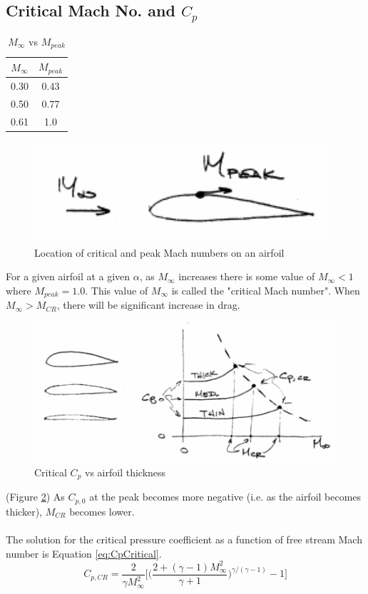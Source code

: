 \documentclass[draft=false, titlepage]{article}
\begin{document}
\subsection{Critical Mach No. and $C_p$}
\begin{table}
	\caption{$M_\infty$ vs $M_{peak}$}
	\centering
	\begin{tabular}{cc}
		$M_\infty$ & $M_{peak}$\\
		\hline
		0.30 & 0.43\\
		0.50 & 0.77\\
		0.61 & 1.0\\
	\end{tabular}
\end{table}
\begin{figure}[ht]
	\centering
	\includegraphics[width=0.4\linewidth]{Figures/p49_criticalM.PNG}
	\caption{Location of critical and peak Mach numbers on an airfoil}
	\label{fig:p49_criticalM}
\end{figure}
For a given airfoil at a given $\alpha$, as $M_\infty$ increases there is some value of $M_\infty < 1$ where $M_{peak} = 1.0$. This value of $M_\infty$ is called the "critical Mach number". When $M_\infty > M_{CR}$, there will be significant increase in drag.

\begin{figure}[ht]
	\centering
	\includegraphics[width=0.8\linewidth]{Figures/p49_MVsAirfoiLThickness.PNG}
	\caption{Critical $C_p$ vs airfoil thickness}
	\label{fig:p49_MVsAirfoiLThickness}
\end{figure}

(Figure \ref{fig:p49_MVsAirfoiLThickness}) As $C_{p,0}$ at the peak becomes more negative (i.e. as the airfoil becomes thicker), $M_{CR}$ becomes lower.
\paragraph*{}The solution for the critical pressure coefficient as a function of free stream Mach number is Equation \ref{eq:CpCritical}.
\begin{equation}
C_{p,CR} = \frac{2}{\gamma M_\infty^2} \Bigg[ \Big( \frac{2+(\gamma-1)M_\infty^2}{\gamma+1} \Big)^{\gamma/(\gamma-1)} -1\Bigg]
\label{eq:CpCritical}
\end{equation}
\end{document}
